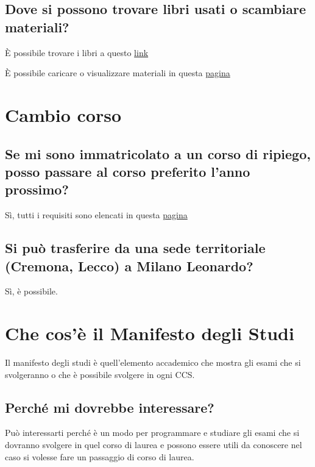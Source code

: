 \documentclass[legal]{polinetwork}
\begin{document}
\subsection{Dove si possono trovare libri usati o scambiare materiali?}


È possibile trovare i libri a questo \href{https://t.me/joinchat/6nmuXXhAOr1mYTJk}{link}

È possibile caricare o visualizzare materiali in questa \href{https://polinetwork.org/it/materials/}{pagina}

\section{Cambio corso}


\subsection{Se mi sono immatricolato a un corso di ripiego, posso passare al corso preferito l'anno prossimo?}


Sì, tutti i requisiti sono elencati in questa \href{https://www.polimi.it/studenti/casi-particolari/passaggi-ai-corsi-di-laurea-di-ingegneria-e-auic-ingegneria-edile-e-delle-costruzioni}{pagina}

\subsection{Si può trasferire da una sede territoriale (Cremona, Lecco) a Milano Leonardo?}


Sì, è possibile.


\section{Che cos'è il Manifesto degli Studi}


Il manifesto degli studi è quell'elemento accademico che mostra gli esami che si svolgeranno o che è possibile svolgere in ogni CCS.

\subsection{Perché mi dovrebbe interessare?}


Può interessarti perché è un modo per programmare e studiare gli esami che si dovranno svolgere in quel corso di laurea e possono essere utili da conoscere nel caso si volesse fare un passaggio di corso di laurea.
\end{document}
